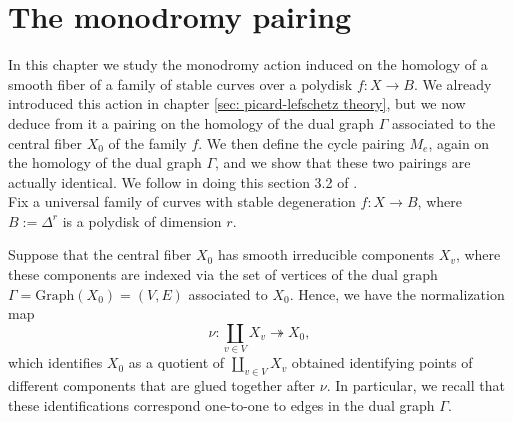 \documentclass[a4paper,12 pt,titlepage,twoside]{book}
\theoremstyle{plain}
\theoremstyle{theorem}
\theoremstyle{definition}
\theoremstyle{remark}
\begin{document}
\chapter{The monodromy pairing}\label{monodromy pairing}
In this chapter we study the monodromy action induced on the homology of a smooth fiber of a family of stable curves over a polydisk $f \colon X \rightarrow B$. We already introduced this action in chapter \ref{sec: picard-lefschetz theory}, but we now deduce from it a pairing on the homology of the dual graph $\Gamma$ associated to the central fiber $X_0$ of the family $f$. We then define the cycle pairing $M_e$, again on the homology of the dual graph $\Gamma$, and we show that these two pairings are actually identical. We follow in doing this section 3.2 of \cite{MR3588803}.\\
	
	Fix a universal family of curves with stable degeneration $f \colon X \rightarrow B$, where $B:= \Delta^r$ is a polydisk of dimension $r$. 
	
	Suppose that the central fiber $X_0$ has smooth irreducible components $X_v$, where these components are indexed via the set of vertices of the dual graph $\Gamma = \text{Graph}(X_0) =(V,E)$ associated to $X_0$. Hence, we have the normalization map $$\nu \colon \coprod_{v \in V} X_v \twoheadrightarrow X_0,$$ which identifies $X_0$ as a quotient of $\coprod_{v \in V}X_v$ obtained identifying points of different components that are glued together after $\nu$.
	In particular, we recall that these identifications correspond one-to-one to edges in the dual graph $\Gamma$. 
	
\end{document}
